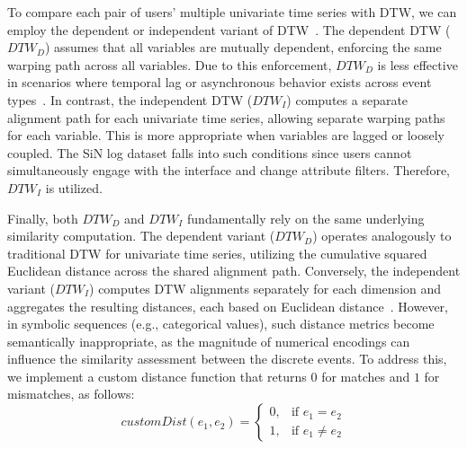 \documentclass[preprint,journal]{vgtc}            %
\begin{document}
To compare each pair of users' multiple univariate time series with DTW, we can employ the dependent or independent variant of DTW~\cite{Shokoohi17Generalizing}.
The dependent DTW ($ DTW_{D} $) assumes that all variables are mutually dependent, enforcing the same warping path across all variables.
Due to this enforcement, $ DTW_{D} $ is less effective in scenarios where temporal lag or asynchronous behavior exists across event types~\cite{Shokoohi17Generalizing}.
In contrast, the independent DTW ($ DTW_{I} $) computes a separate alignment path for each univariate time series, allowing separate warping paths for each variable.
This is more appropriate when variables are lagged or loosely coupled.
The SiN log dataset falls into such conditions since users cannot simultaneously engage with the interface and change attribute filters.
Therefore, $ DTW_{I} $ is utilized.

Finally, both $DTW_{D}$ and $DTW_{I}$ fundamentally rely on the same underlying similarity computation.
The dependent variant ($DTW_{D}$) operates analogously to traditional DTW for univariate time series, utilizing the cumulative squared Euclidean distance across the shared alignment path.
Conversely, the independent variant ($DTW_{I}$) computes DTW alignments separately for each dimension and aggregates the resulting distances, each based on Euclidean distance~\cite{Shokoohi17Generalizing}.
However, in symbolic sequences (e.g., categorical values), such distance metrics become semantically inappropriate, as the magnitude of numerical encodings can influence the similarity assessment between the discrete events. 
To address this, we implement a custom distance function that returns $0$ for matches and $1$ for mismatches, as follows:
\begin{equation}
customDist(e_1, e_2) =
\begin{cases}
0, & \text{if } e_1 = e_2 \\
1, & \text{if } e_1 \ne e_2
\end{cases}
\end{equation}
\end{document}
